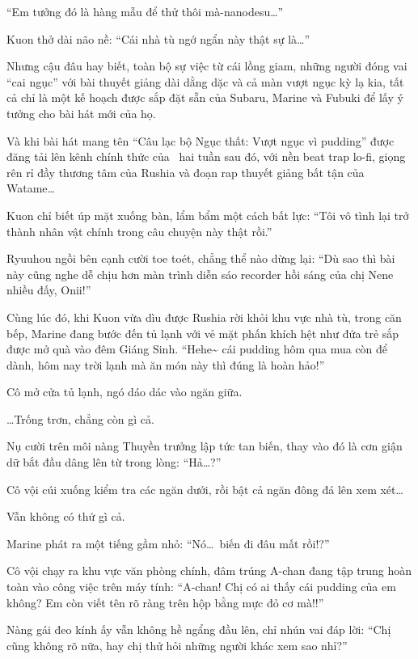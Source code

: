 \documentclass[../main.tex]{subfiles}
\begin{document}
``Em tưởng đó là hàng mẫu để thử thôi mà-nanodesu\dots''

Kuon thở dài não nề: ``Cái nhà tù ngớ ngẩn này thật sự là\dots''

Nhưng cậu đâu hay biết, toàn bộ sự việc từ cái lồng giam, những người đóng vai ``cai ngục'' với bài thuyết giảng dài dằng dặc và cả màn vượt ngục kỳ lạ kia, tất cả chỉ là một kế hoạch được sắp đặt sẵn của Subaru, Marine và Fubuki để lấy ý tưởng cho bài hát mới của họ.

Và khi bài hát mang tên ``Câu lạc bộ Ngục thất: Vượt ngục vì pudding'' được đăng tải lên kênh chính thức của \hll\ hai tuần sau đó, với nền beat trap lo-fi, giọng rên rỉ đầy thương tâm của Rushia và đoạn rap thuyết giảng bất tận của Watame\dots

Kuon chỉ biết úp mặt xuống bàn, lẩm bẩm một cách bất lực: ``Tôi vô tình lại trở thành nhân vật chính trong câu chuyện này thật rồi.''

Ryuuhou ngồi bên cạnh cười toe toét, chẳng thể nào dừng lại: ``Dù sao thì bài này cũng nghe dễ chịu hơn màn trình diễn sáo recorder hồi sáng của chị Nene nhiều đấy, Onii!''

\ct

Cùng lúc đó, khi Kuon vừa dìu được Rushia rời khỏi khu vực nhà tù, trong căn bếp, Marine đang bước đến tủ lạnh với vẻ mặt phấn khích hệt như đứa trẻ sắp được mở quà vào đêm Giáng Sinh. ``Hehe\~{} cái pudding hôm qua mua còn để dành, hôm nay trời lạnh mà ăn món này thì đúng là hoàn hảo!''

Cô mở cửa tủ lạnh, ngó dáo dác vào ngăn giữa.

\dots Trống trơn, chẳng còn gì cả.

Nụ cười trên môi nàng Thuyền trưởng lập tức tan biến, thay vào đó là cơn giận dữ bắt đầu dâng lên từ trong lòng: ``Hả\dots?''

Cô vội cúi xuống kiểm tra các ngăn dưới, rồi bật cả ngăn đông đá lên xem xét\dots

Vẫn không có thứ gì cả.

Marine phát ra một tiếng gầm nhỏ: ``Nó\dots\ biến đi đâu mất rồi!?''

Cô vội chạy ra khu vực văn phòng chính, đâm trúng A-chan đang tập trung hoàn toàn vào công việc trên máy tính: ``A-chan! Chị có ai thấy cái pudding của em không? Em còn viết tên rõ ràng trên hộp bằng mực đỏ cơ mà!!''

Nàng gái đeo kính ấy vẫn không hề ngẩng đầu lên, chỉ nhún vai đáp lời: ``Chị cũng không rõ nữa, hay chị thử hỏi những người khác xem sao nhỉ?''
\end{document}

